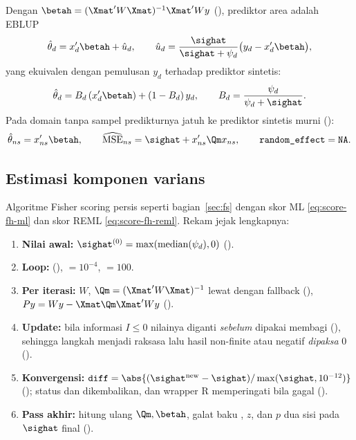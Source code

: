 Dengan $\betah=(\Xmat'W\Xmat)^{-1}\Xmat'Wy$ (),
prediktor area adalah EBLUP
\begin{equation}
  \hat\theta_d=x_d'\betah+\hat u_d,\qquad
  \hat u_d=\frac{\sighat}{\sighat+\psi_d}\bigl(y_d-x_d'\betah\bigr),
  \label{eq:fh-pred}
\end{equation}
yang ekuivalen dengan pemulusan $y_d$ terhadap prediktor sintetis:
\begin{equation}
  \hat\theta_d=B_d\,(x_d'\betah)+(1-B_d)\,y_d,
  \qquad B_d=\frac{\psi_d}{\psi_d+\sighat}.
  \label{eq:fh-shrink}
\end{equation}
Pada domain tanpa sampel predikturnya jatuh ke prediktor sintetis murni
():
\begin{equation}
  \hat\theta_{ns}=x_{ns}'\betah,\qquad
  \widehat{\mathrm{MSE}}_{ns}=\sighat+x_{ns}'\Qm x_{ns},\qquad
  \texttt{random\_effect}=\texttt{NA}.
  \label{eq:fh-unsampled}
\end{equation}

\subsection{Estimasi komponen varians}\label{sec:fh-varians}

Algoritme Fisher scoring persis seperti bagian~\ref{sec:fs} dengan skor ML
\eqref{eq:score-fh-ml} dan skor REML \eqref{eq:score-fh-reml}. Rekam jejak
lengkapnya:

\begin{enumerate}[label=\arabic*.]
  \item \textbf{Nilai awal:} ${\sighat}{}^{(0)}=\max(\mathrm{median}(\psi_d),0)$
        ().
  \item \textbf{Loop:} 
        (),  $=10^{-4}$,  $=100$.
  \item \textbf{Per iterasi:} $W$, $\Qm=(\Xmat'W\Xmat)^{-1}$ lewat
         dengan fallback  (),
        $Py=Wy-\Xmat\Qm\Xmat'Wy$ ().
  \item \textbf{Update:} bila informasi $I\le0$ nilainya diganti
         \emph{sebelum} dipakai
        membagi (), sehingga langkah menjadi raksasa lalu
        hasil non-finite atau negatif \emph{dipaksa} $0$ ().
  \item \textbf{Konvergensi:} $\texttt{diff}=\abs{({\sighat}{}^{\text{new}}-\sighat)/
        \max(\sighat,10^{-12})}$ (); status
         dan  dikembalikan, dan wrapper R
        memperingati bila gagal ().
  \item \textbf{Pass akhir:} hitung ulang $\Qm,\betah$, galat baku
        , $z$, dan $p$ dua sisi pada $\sighat$ final
        ().
\end{enumerate}

